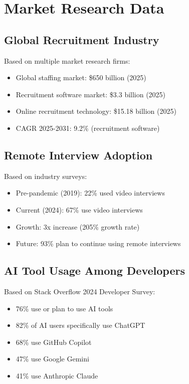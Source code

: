 \documentclass[11pt,letterpaper]{article}
\begin{document}

\newpage
\appendix

\section{Market Research Data}

\subsection{Global Recruitment Industry}

Based on multiple market research firms\cite{qxglobal2025,coherent2024,mordor2025}:
\begin{itemize}[noitemsep]
    \item Global staffing market: \$650 billion (2025)
    \item Recruitment software market: \$3.3 billion (2025)
    \item Online recruitment technology: \$15.18 billion (2025)
    \item CAGR 2025-2031: 9.2\% (recruitment software)
\end{itemize}

\subsection{Remote Interview Adoption}

Based on industry surveys\cite{withe2024,adaface2024}:
\begin{itemize}[noitemsep]
    \item Pre-pandemic (2019): 22\% used video interviews
    \item Current (2024): 67\% use video interviews
    \item Growth: 3x increase (205\% growth rate)
    \item Future: 93\% plan to continue using remote interviews
\end{itemize}

\subsection{AI Tool Usage Among Developers}

Based on Stack Overflow 2024 Developer Survey\cite{stackoverflow2024}:
\begin{itemize}[noitemsep]
    \item 76\% use or plan to use AI tools
    \item 82\% of AI users specifically use ChatGPT
    \item 68\% use GitHub Copilot
    \item 47\% use Google Gemini
    \item 41\% use Anthropic Claude
\end{itemize}
\end{document}
